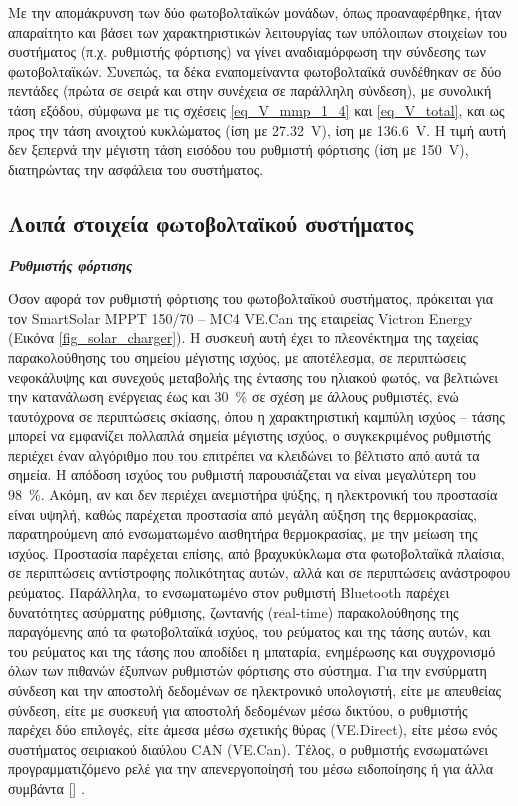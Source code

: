 \documentclass[12pt, a4paper]{report} %
\DeclareRobustCommand{\lcitep}[1]{%
  \english{[\cite{#1}]}%
}
\newcommand{\english}{\foreignlanguage{english}}
\begin{document}
Με την απομάκρυνση των δύο φωτοβολταϊκών μονάδων, όπως προαναφέρθηκε, ήταν απαραίτητο και βάσει των χαρακτηριστικών 
λειτουργίας των υπόλοιπων στοιχείων του συστήματος (π.χ. ρυθμιστής φόρτισης) να γίνει αναδιαμόρφωση την σύνδεσης των 
φωτοβολταϊκών. Συνεπώς, τα δέκα εναπομείναντα φωτοβολταϊκά συνδέθηκαν σε δύο πεντάδες (πρώτα σε σειρά και στην συνέχεια 
σε παράλληλη σύνδεση), με συνολική τάση εξόδου, σύμφωνα με τις σχέσεις \ref{eq_V_mmp_1_4} και \ref{eq_V_total}, και ως 
προς την τάση ανοιχτού κυκλώματος (ίση με \SI{27,32}{\volt}), ίση με \SI{136,6}{\volt}. Η τιμή αυτή δεν ξεπερνά την 
μέγιστη τάση εισόδου του ρυθμιστή φόρτισης (ίση με \SI{150}{\volt}), διατηρώντας την ασφάλεια του συστήματος.

\subsection{Λοιπά στοιχεία φωτοβολταϊκού συστήματος}\label{sub_loipa_PVs}

\noindent \textit{\textbf{Ρυθμιστής φόρτισης}}

\vspace{0.2cm}

Όσον αφορά τον ρυθμιστή φόρτισης του φωτοβολταϊκού συστήματος, πρόκειται για τον \english{SmartSolar MPPT 150/70 – 
MC4 VE.Can} της εταιρείας \english{Victron Energy} (Εικόνα \ref{fig_solar_charger}). Η συσκευή αυτή έχει το πλεονέκτημα 
της ταχείας παρακολούθησης του σημείου μέγιστης ισχύος, με αποτέλεσμα, σε περιπτώσεις νεφοκάλυψης και συνεχούς μεταβολής 
της έντασης του ηλιακού φωτός, να βελτιώνει την κατανάλωση ενέργειας έως και \SI{30}{\percent} σε σχέση με άλλους ρυθμιστές, 
ενώ ταυτόχρονα σε περιπτώσεις σκίασης, όπου η χαρακτηριστική καμπύλη ισχύος – τάσης μπορεί να εμφανίζει πολλαπλά σημεία 
μέγιστης ισχύος, ο συγκεκριμένος ρυθμιστής περιέχει έναν αλγόριθμο που του επιτρέπει να κλειδώνει το βέλτιστο από αυτά τα 
σημεία. Η απόδοση ισχύος του ρυθμιστή παρουσιάζεται να είναι μεγαλύτερη του \SI{98}{\percent}. Ακόμη, αν και δεν περιέχει 
ανεμιστήρα ψύξης, η ηλεκτρονική του προστασία είναι υψηλή, καθώς παρέχεται προστασία από μεγάλη αύξηση της θερμοκρασίας, 
παρατηρούμενη από ενσωματωμένο αισθητήρα θερμοκρασίας, με την μείωση της ισχύος. Προστασία παρέχεται επίσης, από 
βραχυκύκλωμα στα φωτοβολταϊκά πλαίσια, σε περιπτώσεις αντίστροφης πολικότητας αυτών, αλλά και σε περιπτώσεις ανάστροφου 
ρεύματος. Παράλληλα, το ενσωματωμένο στον ρυθμιστή \english{Bluetooth} παρέχει δυνατότητες ασύρματης ρύθμισης, ζωντανής 
(\english{real-time}) παρακολούθησης της παραγόμενης από τα φωτοβολταϊκά ισχύος, του ρεύματος και της τάσης αυτών, και 
του ρεύματος και της τάσης που αποδίδει η μπαταρία, ενημέρωσης και συγχρονισμό όλων των πιθανών έξυπνων ρυθμιστών φόρτισης 
στο σύστημα. Για την ενσύρματη σύνδεση και την αποστολή δεδομένων σε ηλεκτρονικό υπολογιστή, είτε με απευθείας σύνδεση, 
είτε με συσκευή για αποστολή δεδομένων μέσω δικτύου, ο ρυθμιστής παρέχει δύο επιλογές, είτε άμεσα μέσω σχετικής θύρας 
(\english{VE.Direct}), είτε μέσω ενός συστήματος σειριακού διαύλου \english{CAN (VE.Can)}. Τέλος, ο ρυθμιστής ενσωματώνει 
προγραμματιζόμενο ρελέ για την απενεργοποίησή του μέσω ειδοποίησης ή για άλλα συμβάντα \lcitep{diataksi_bib7}.
\end{document}
